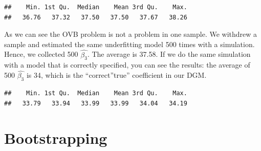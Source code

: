 \documentclass[
]{book}
\newenvironment{Shaded}{\begin{snugshade}}{\end{snugshade}}
\newcommand{\AttributeTok}[1]{\textcolor[rgb]{0.77,0.63,0.00}{#1}}
\newcommand{\CommentTok}[1]{\textcolor[rgb]{0.56,0.35,0.01}{\textit{#1}}}
\newcommand{\ConstantTok}[1]{\textcolor[rgb]{0.00,0.00,0.00}{#1}}
\newcommand{\ControlFlowTok}[1]{\textcolor[rgb]{0.13,0.29,0.53}{\textbf{#1}}}
\newcommand{\DecValTok}[1]{\textcolor[rgb]{0.00,0.00,0.81}{#1}}
\newcommand{\FunctionTok}[1]{\textcolor[rgb]{0.00,0.00,0.00}{#1}}
\newcommand{\NormalTok}[1]{#1}
\newcommand{\OtherTok}[1]{\textcolor[rgb]{0.56,0.35,0.01}{#1}}
\newcommand{\SpecialCharTok}[1]{\textcolor[rgb]{0.00,0.00,0.00}{#1}}
\newcommand{\StringTok}[1]{\textcolor[rgb]{0.31,0.60,0.02}{#1}}
\begin{document}
\begin{verbatim}
##    Min. 1st Qu.  Median    Mean 3rd Qu.    Max. 
##   36.76   37.32   37.50   37.50   37.67   38.26
\end{verbatim}

As we can see the OVB problem is not a problem in one sample. We withdrew a sample and estimated the same underfitting model 500 times with a simulation. Hence, we collected 500 \(\hat{\beta_3}\). The average is 37.58. If we do the same simulation with a model that is correctly specified, you can see the results: the average of 500 \(\hat{\beta_3}\) is 34, which is the ``correct''true'' coefficient in our DGM.

\begin{Shaded}
\end{Shaded}

\begin{verbatim}
##    Min. 1st Qu.  Median    Mean 3rd Qu.    Max. 
##   33.79   33.94   33.99   33.99   34.04   34.19
\end{verbatim}

\hypertarget{bootstrapping}{%
\section{Bootstrapping}\label{bootstrapping}}
\end{document}
